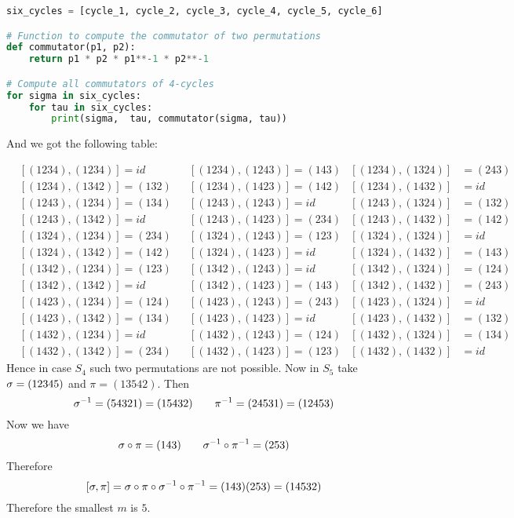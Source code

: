 \documentclass[a4paper, 11pt]{article}
\begin{document}
\begin{itemize}
\begin{lstlisting}[language=Python]
six_cycles = [cycle_1, cycle_2, cycle_3, cycle_4, cycle_5, cycle_6]

# Function to compute the commutator of two permutations
def commutator(p1, p2):
	return p1 * p2 * p1**-1 * p2**-1

# Compute all commutators of 4-cycles
for sigma in six_cycles:
	for tau in six_cycles:
		print(sigma,  tau, commutator(sigma, tau))
\end{lstlisting}

And we got the following table:

\begin{align*}
	 & [(1 2 3 4), (1 2 3 4)]= id        &  & [(1 2 3 4), (1 2 4 3)]= (1 4 3)    & [(1 2 3 4), (1 3 2 4)] & = (2 4 3)    \\
	 & [(1 2 3 4), (1 3 4 2)]= (1 3 2) &  & [(1 2 3 4), (1 4 2 3)]= (1 4 2)    & [(1 2 3 4), (1 4 3 2)] & = id        \\
	 & [(1 2 4 3), (1 2 3 4)]= (1 3 4)    &  & [(1 2 4 3), (1 2 4 3)]= id        & [(1 2 4 3), (1 3 2 4)] & = (1 3 2) \\
	 & [(1 2 4 3), (1 3 4 2)]=    id     &  & [(1 2 4 3), (1 4 2 3)]= (2 3 4)    & [(1 2 4 3), (1 4 3 2)] & = (1 4 2)    \\
	 & [(1 3 2 4), (1 2 3 4)]= (2 3 4)    &  & [(1 3 2 4), (1 2 4 3)]= (1 2 3) & [(1 3 2 4), (1 3 2 4)] & = id      \\
	 & [(1 3 2 4), (1 3 4 2)]= (1 4 2)    &  & [(1 3 2 4), (1 4 2 3)]= id        & [(1 3 2 4), (1 4 3 2)] & = (1 4 3)    \\
	 & [(1 3 4 2), (1 2 3 4)]= (1 2 3) &  & [(1 3 4 2), (1 2 4 3)]= id      & [(1 3 4 2), (1 3 2 4)] & = (1 2 4)    \\
	 & [(1 3 4 2), (1 3 4 2)]= id        &  & [(1 3 4 2), (1 4 2 3)]= (1 4 3)    & [(1 3 4 2), (1 4 3 2)] & = (2 4 3)    \\
	 & [(1 4 2 3), (1 2 3 4)]= (1 2 4)    &  & [(1 4 2 3), (1 2 4 3)]= (2 4 3)    & [(1 4 2 3), (1 3 2 4)] & = id        \\
	 & [(1 4 2 3), (1 3 4 2)]= (1 3 4)    &  & [(1 4 2 3), (1 4 2 3)]= id        & [(1 4 2 3), (1 4 3 2)] & = (1 3 2) \\
	 & [(1 4 3 2), (1 2 3 4)]= id        &  & [(1 4 3 2), (1 2 4 3)]= (1 2 4)    & [(1 4 3 2), (1 3 2 4)] & = (1 3 4)    \\
	 & [(1 4 3 2), (1 3 4 2)]= (2 3 4)    &  & [(1 4 3 2), (1 4 2 3)]=(1 2 3) & [(1 4 3 2), (1 4 3 2)] & = id
\end{align*}
Hence in case $S_4$ such two permutations are not possible. Now in $S_5$ take $\sigma=(12345)$ and $\pi=(13542)$. Then $$\sigma^{-1}=(54321)=(15432)\qquad \pi^{-1}=(24531)=(12453)$$Now we have $$\sigma\circ\pi=(143)\qquad \sigma^{-1}\circ\pi^{-1}=(253)$$Therefore $$[\sigma,\pi]=\sigma\circ\pi\circ \sigma^{-1}\circ\pi^{-1}=(143)(253)=(14532)$$Therefore the smallest $m$ is $5$. 
\end{itemize}\parinf
\end{document}
